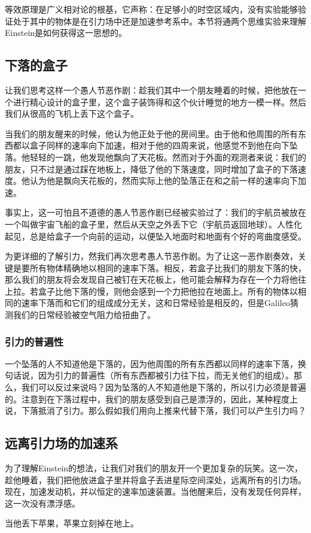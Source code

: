 
等效原理是广义相对论的根基，它声称：在足够小的时空区域内，没有实验能够验证处于其中的物体是在引力场中还是加速参考系中。本节将通两个思维实验来理解Einstein是如何获得这一思想的。

\subsection{下落的盒子}
让我们思考这样一个愚人节恶作剧：趁我们其中一个朋友睡着的时候，把他放在一个进行精心设计的盒子里，这个盒子装饰得和这个伙计睡觉的地方一模一样。然后我们从很高的飞机上丢下这个盒子。

当我们的朋友醒来的时候，他认为他正处于他的房间里。由于他和他周围的所有东西都以盒子同样的速率向下加速，相对于他的四周来说，他感觉不到他在向下坠落。他轻轻的一跳，他发现他飘向了天花板。然而对于外面的观测者来说：我们的朋友，只不过是通过踩在地板上，降低了他的下落速度，同时增加了盒子的下落速度。他认为他是飘向天花板的，然而实际上他的坠落正在和之前一样的速率向下加速。

事实上，这一可怕且不道德的愚人节恶作剧已经被实验过了：我们的宇航员被放在一个叫做宇宙飞船的盒子里，然后从天空之外丢下它（宇航员返回地球）。人性化起见，总是给盒子一个向前的运动，以便坠入地面时和地面有个好的弯曲度感受。

为更详细的了解引力，然我们再次思考愚人节恶作剧。为了让这一恶作剧奏效，关键是要所有物体精确地以相同的速率下落。相反，若盒子比我们的朋友下落的快，那么我们的朋友将会发现自己被钉在天花板上，他可能会解释为存在一个力将他往上拉。若盒子比他下落的慢，则他会感到一个力把他拉在地面上。所有的物体以相同的速率下落而和它们的组成成分无关，这和日常经验是相反的，但是Galileo猜测我们的日常经验被空气阻力给扭曲了。

\subsubsection{引力的普遍性}
一个坠落的人不知道他是下落的，因为他周围的所有东西都以同样的速率下落，换句话说，因为引力的普遍性（所有东西都被引力往下拉，而无关他们的组成）。那么，我们可以反过来说吗？因为坠落的人不知道他是下落的，所以引力必须是普遍的。注意到在下落过程中，我们的朋友感受到自己是漂浮的，因此，某种程度上说，下落抵消了引力。那么假如我们用向上推来代替下落，我们可以产生引力吗？

\subsection{远离引力场的加速系}
为了理解Einstein的想法，让我们对我们的朋友开一个更加复杂的玩笑。这一次，趁他睡着，我们把他放进盒子里并将盒子丢进星际空间深处，远离所有的引力场。现在，加速发动机，并以恒定的速率加速装置。当他醒来后，没有发现任何异样，这一次没有漂浮感。

当他丢下苹果，苹果立刻掉在地上。





